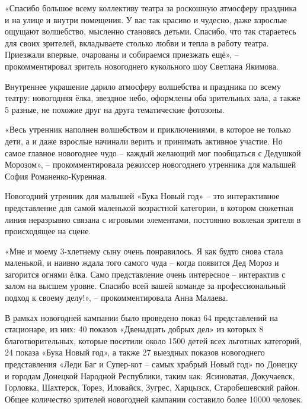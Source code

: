 
«Спасибо большое всему коллективу театра за роскошную атмосферу праздника и на
улице и внутри помещения. У вас так красиво и чудесно, даже взрослые ощущают
волшебство, мысленно становясь детьми. Спасибо, что так стараетесь для своих
зрителей, вкладываете столько любви и тепла в работу театра. Приезжали впервые,
очарованы и собираемся приезжать ещё», – прокомментировал зритель новогоднего
кукольного шоу Светлана Якимова.


Внутреннее украшение дарило атмосферу волшебства и праздника по всему театру:
новогодняя ёлка, звездное небо, оформлены оба зрительных зала, а также 5
разные, не похожие друг на друга тематические фотозоны.

«Весь утренник наполнен волшебством и приключениями, в которое не только дети,
а и даже взрослые начинали верить и принимать активное участие. Но самое
главное новогоднее чудо – каждый желающий мог пообщаться с Дедушкой Морозом», –
прокомментировала режиссер новогоднего утренника для малышей София
Романенко-Куренная.


Новогодний утренник для малышей «Бука Новый год» – это интерактивное
представление для самой маленькой возрастной категории, в котором сюжетная
линия неразрывно связана с игровыми элементами, постоянно вовлекая зрителя в
происходящее на сцене.


«Мне и моему 3-хлетнему сыну очень понравилось. Я как будто снова стала
маленькой, и наивно ждала того самого чуда – когда появится Дед Мороз и
загорится огнями ёлка. Само представление очень интересное – интерактив с залом
на высшем уровне. Спасибо всей вашей команде за профессиональный подход к
своему делу!», – прокомментировала Анна Малаева.

В рамках новогодней кампании было проведено показ 64 представлений на
стационаре, из них: 40 показов «Двенадцать добрых дел» из которых 8
благотворительных, которые посетили около 1500 детей всех льготных категорий,
24 показа «Бука Новый год», а также 27 выездных показов новогоднего
представления «Леди Баг и Супер-кот – самых храбрый Новый год» по Донецку и
городам Донецкой Народной Республики, таким как: Ясиноватая, Докучаевск,
Горловка, Шахтерск, Торез, Иловайск, Зугрес, Харцызск, Старобешевский район.
Общее количество зрителей новогодней кампании составило более 10000 человек.
